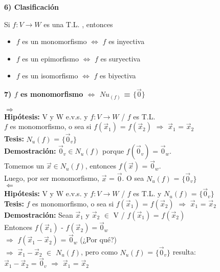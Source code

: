 \documentclass[11pt]{article}
\begin{document}
\vspace{2mm} \noindent
{\Large \bfseries{6) Clasificación}}

\vspace{2mm} \noindent
Si $f:V \rightarrow W$ es una T.L. , entonces
\begin{itemize}
\item $f$ es un monomorfismo $\Leftrightarrow$ $f$ es inyectiva
\item $f$ es un epimorfismo $\Leftrightarrow$ $f$ es suryectiva
\item $f$ es un isomorfismo $\Leftrightarrow$ $f$ es biyectiva
\end{itemize}

\vspace{2mm} \noindent
{\Large \bfseries{7) $f$ es monomorfismo $\Leftrightarrow$ $Nu_(f)$ = $\{\vec{0}\}$}}

\vspace{2mm} \noindent
$\Longrightarrow$ \\
{\bfseries Hipótesis:} V y W e.v.s. y $f: V \rightarrow W$ / $f$ es T.L. \\ $f$ es monomorfismo, o sea si $f(\vec{x}_1)$ = $f(\vec{x}_2)$ $\Rightarrow$ $\vec{x}_1$ = $\vec{x}_2$ \\
{\bfseries Tesis:} $N_u(f)$ = $\{\vec{0}_v\}$ \\
{\bfseries Demostración:} $\vec{0}_v \in N_u(f)$ porque $f(\vec{0}_v)$ = $\vec{0}_w$. \\
Tomemos un $\vec{x} \in N_u(f)$, entonces $f(\vec{x})$ = $\vec{0}_w$. \\
Luego, por ser monomorfismo, $\vec{x}$ = $\vec{0}$. O sea $N_u(f)$ = $\{\vec{0}_v\}$ \\
$\Longleftarrow$ \\
{\bfseries Hipótesis:} V y W e.v.s. y $f: V \rightarrow W$ / $f$ es T.L. y $N_u(f)$ = $\{\vec{0}_v\}$  \\
{\bfseries Tesis:}  $f$ es monomorfismo, o sea si $f(\vec{x}_1)$ = $f(\vec{x}_2)$ $\Rightarrow$ $\vec{x}_1$ = $\vec{x}_2$\\
{\bfseries Demostración:} Sean $\vec{x}_1$ y $\vec{x}_2$ $\in$ V / $f(\vec{x}_1)$ = $f(\vec{x}_2)$\\
Entonces 
$f(\vec{x}_1)$ - $f(\vec{x}_2) = \vec{0}_w$  \\
$\Rightarrow$ $f(\vec{x}_1 - \vec{x}_2)$ = $\vec{0}_w$ (¿Por qué?) \\
$\Rightarrow$ $\vec{x}_1 - \vec{x}_2$ $\in$ $N_u(f)$, pero como $N_u(f)$ = $\{\vec{0}_v\}$  resulta: \\
$\vec{x}_1 - \vec{x}_2$ = $\vec{0}_v$ $\Rightarrow$ $\vec{x}_1$ = $\vec{x}_2$
\end{document}
